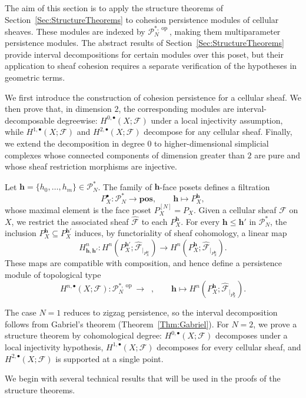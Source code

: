 \documentclass[reqno,12pt]{amsart}
\newcommand{\cF}{{\mathcal F}}
\newcommand{\cP}{\mathcal{P}}
\DeclareMathOperator{\vect}{\mathbf{vect}_\Bbbk}
\newcommand{\pos}{\mathbf{pos}}
\DeclareMathOperator{\op}{op}
\newcommand{\0}{\mathbf 0}
\newcommand{\h}{\mathbf{h}}
\theoremstyle{definition}
\begin{document}
The aim of this section is to apply the structure theorems of Section~\ref{Sec:StructureTheorems} to cohesion persistence modules of cellular sheaves. These modules are indexed by $\cP^{*,\op}_N$, making them multiparameter persistence modules. The abstract results of Section~\ref{Sec:StructureTheorems} provide interval decompositions for certain modules over this poset, but their application to sheaf cohesion requires a separate verification of the hypotheses in geometric terms.

We first introduce the construction of cohesion persistence for a cellular sheaf. We then prove that, in dimension $2$, the corresponding modules are interval-decomposable degreewise: $H^{0,\bullet}(X;\cF)$ under a local injectivity assumption, while $H^{1,\bullet}(X;\cF)$ and $H^{2,\bullet}(X;\cF)$ decompose for any cellular sheaf. Finally, we extend the decomposition in degree $0$ to higher-dimensional simplicial complexes whose connected components of dimension greater than $2$ are pure and whose sheaf restriction morphisms are injective.


Let $\h=\{h_0,\dots,h_m\}\in \cP^{*}_N$. The family of $\h$-face posets defines a filtration
\[
    P_X^\bullet\colon \cP^{*}_N\longrightarrow \pos,
    \qquad
    \h\longmapsto P_X^\h,
\]
whose maximal element is the face poset $P_X^{[N]}=P_X$. Given a cellular sheaf $\cF$ on $X$, we restrict the associated sheaf $\widehat{\cF}$ to each $P_X^\h$. For every $\h\leq \h'$ in $\cP^{*}_N$, the inclusion $P_X^\h\subseteq P_X^{\h'}$ induces, by functoriality of sheaf cohomology, a linear map
\[
H^{n}_{\h,\h'}\colon
H^n(P_X^{\h'};\widehat{\cF}_{|_{P_X^{\h'}}})
\longrightarrow
H^n(P_X^{\h};\widehat{\cF}_{|_{P_X^{\h}}}) .
\]
These maps are compatible with composition, and hence define a persistence module of topological type
\[
    H^{n,\bullet}(X;\cF)\colon
    \cP^{*,\op}_N\longrightarrow \vect,
    \qquad
    \h\longmapsto
    H^n(P_X^\h;\widehat{\cF}_{|_{P_X^\h}}).
\]

The case $N=1$ reduces to zigzag persistence, so the interval decomposition follows from Gabriel's theorem (Theorem~\ref{Thm:Gabriel}). For $N=2$, we prove a structure theorem by cohomological degree: $H^{0,\bullet}(X;\cF)$ decomposes under a local injectivity hypothesis, $H^{1,\bullet}(X;\cF)$ decomposes for every cellular sheaf, and $H^{2,\bullet}(X;\cF)$ is supported at a single point. 

We begin with several technical results that will be used in the proofs of the structure theorems.
\end{document}
